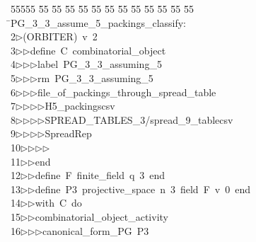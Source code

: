 %
%
\begin{tabbing}
55555 \= 55 \= 55 \= 55 \= 55 \= 55 \= 55 \= 55 \= 55 \= 55 \= 55 \= 55 \= 55 \= \>PG\_3\_3\_assume\_5\_packings\_classify:\\[0pt]
2\>$\triangleright$\>(ORBITER)\ v\ 2\ \\[0pt]
3\>$\triangleright$\>$\triangleright$\>define\ C\ combinatorial\_object\ \\[0pt]
4\>$\triangleright$\>$\triangleright$\>$\triangleright$\>label\ PG\_3\_3\_assuming\_5\ \\[0pt]
5\>$\triangleright$\>$\triangleright$\>$\triangleright$\>rm\ PG\_3\_3\_assuming\_5\ \\[0pt]
6\>$\triangleright$\>$\triangleright$\>$\triangleright$\>file\_of\_packings\_through\_spread\_table\ \\[0pt]
7\>$\triangleright$\>$\triangleright$\>$\triangleright$\>$\triangleright$\>H5\_packingscsv\ \\[0pt]
8\>$\triangleright$\>$\triangleright$\>$\triangleright$\>$\triangleright$\>SPREAD\_TABLES\_3/spread\_9\_tablecsv\ \\[0pt]
9\>$\triangleright$\>$\triangleright$\>$\triangleright$\>$\triangleright$\>SpreadRep\ \\[0pt]
10\>$\triangleright$\>$\triangleright$\>$\triangleright$\>$\triangleright$\ \\[0pt]
11\>$\triangleright$\>$\triangleright$\>end\ \\[0pt]
12\>$\triangleright$\>$\triangleright$\>define\ F\ finite\_field\ q\ 3\ end\ \\[0pt]
13\>$\triangleright$\>$\triangleright$\>define\ P3\ projective\_space\ n\ 3\ field\ F\ v\ 0\ end\ \\[0pt]
14\>$\triangleright$\>$\triangleright$\>with\ C\ do\ \\[0pt]
15\>$\triangleright$\>$\triangleright$\>combinatorial\_object\_activity\ \\[0pt]
16\>$\triangleright$\>$\triangleright$\>$\triangleright$\>canonical\_form\_PG\ P3\ \\[0pt]

\end{tabbing}
